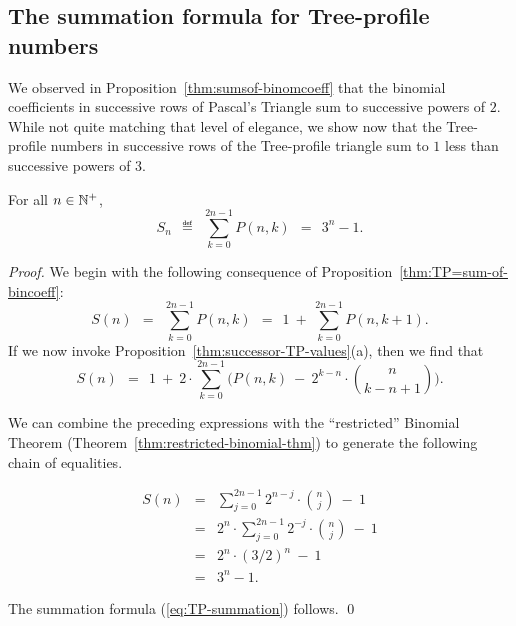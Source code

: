 \subsection{The summation formula for Tree-profile numbers}

We observed in Proposition~\ref{thm:sumsof-binomcoeff} that the binomial coefficients in successive rows of Pascal's Triangle sum to successive powers of $2$.  While not quite matching that level of elegance, we show now that the Tree-profile numbers in successive rows of the Tree-profile triangle sum to $1$ less than successive powers of $3$.

\begin{prop}
\label{thm:TP-summation}
For all $n \in \mathbb{N}^+$,
\begin{equation}
\label{eq:TP-summation}
S_n \ \ \eqdef \ \ \sum_{k=0}^{2n-1} P(n,k) \ \ = \ \ 3^n -1.
\end{equation}
\end{prop}
 
\begin{proof}
We begin with the following consequence of Proposition~\ref{thm:TP=sum-of-bincoeff}:
\[
S(n) \ \ = \ \  \sum_{k=0}^{2n-1} P(n,k)  \ \ = \ \  1 \ + \ \sum_{k=0}^{2n-1} P(n,k+1).
\]
If we now invoke Proposition~\ref{thm:successor-TP-values}(a), then we find that
\[
S(n) \ \ = \ \ 1 \ + \ 2 \cdot \sum_{k=0}^{2n-1}   \big( P(n,k) \ - \ 2^{k-n} \cdot {n \choose {k-n+1}} \big).
\]

We can combine the preceding expressions with the ``restricted'' Binomial Theorem (Theorem~\ref{thm:restricted-binomial-thm}) to generate the following chain of equalities.

\begin{eqnarray*}
S(n) & = & 
\sum_{j=0}^{2n-1} 2^{n-j} \cdot {n \choose j} \ - \ 1  \\
     & = &
2^n \cdot \sum_{j=0}^{2n-1} 2^{-j}  \cdot {n \choose j} \ - \ 1 \\
     & = & 
2^n \cdot (3/2)^n \ - \ 1 \\
     & = &
3^n -1.
\end{eqnarray*}

The summation formula (\ref{eq:TP-summation}) follows.  \qed
\end{proof}
 


